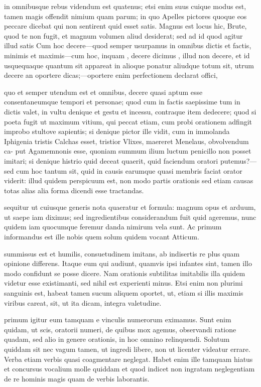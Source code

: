  in omnibusque rebus videndum est quatenus; etsi enim suus cuique modus est, tamen magis offendit nimium quam parum; in quo Apelles pictores quoque eos peccare dicebat qui non sentirent quid esset satis. Magnus est locus hic, Brute, quod te non fugit, et magnum volumen aliud desiderat; sed ad id quod agitur illud satis Cum hoc decere—quod semper usurpamus in omnibus dictis et factis, minimis et maximis—cum hoc, inquam , decere dicimus , illud non decere, et id usquequaque quantum sit appareat in alioque ponatur aliudque totum sit, utrum decere an oportere dicas;—oportere enim perfectionem declarat offici,

 quo et semper utendum est et omnibus, decere quasi aptum esse consentaneumque tempori et personae; quod cum in factis saepissime tum in dictis valet, in vultu denique et gestu et incessu, contraque item dedecere; quod si poeta fugit ut maximum vitium, qui peccat etiam, cum probi orationem adfingit improbo stultove sapientis; si denique pictor ille vidit, cum in immolanda Iphigenia tristis Calchas esset, tristior Vlixes, maereret Menelaus, obvolvendum ca- put Agamemnonis esse, quoniam summum ilium luctum penicillo non posset imitari; si denique histrio quid deceat quaerit, quid faciendum oratori putemus?—sed cum hoc tantum sit, quid in causis earumque quasi membris faciat orator viderit: illud quidem perspicuum est, non modo partis orationis sed etiam causas totas alias alia forma dicendi esse tractandas.

 sequitur ut cuiusque generis nota quaeratur et formula: magnum opus et arduum, ut saepe iam diximus; sed ingredientibus considerandum fuit quid ageremus, nunc quidem iam quocumque feremur danda nimirum vela sunt. Ac primum informandus est ille nobis quem solum quidem vocant Atticum.

 summissus est et humilis, consuetudinem imitans, ab indisertis re plus quam opinione differens. Itaque eum qui audiunt, quamvis ipsi infantes sint, tamen illo modo confidunt se posse dicere. Nam orationis subtilitas imitabilis illa quidem videtur esse existimanti, sed nihil est experienti minus. Etsi enim non plurimi sanguinis est, habeat tamen sucum aliquem oportet, ut, etiam si illis maximis viribus careat, sit, ut ita dicam, integra valetudine.

 primum igitur eum tamquam e vinculis numerorum eximamus. Sunt enim quidam, ut scis, oratorii numeri, de quibus mox agemus, observandi ratione quadam, sed alio in genere orationis, in hoc omnino relinquendi. Solutum quiddam sit nec vagum tamen, ut ingredi libere, non ut licenter videatur errare. Verba etiam verbis quasi coagmentare neglegat. Habet enim ille tamquam hiatus et concursus vocalium molle quiddam et quod indicet non ingratam neglegentiam de re hominis magis quam de verbis laborantis.

